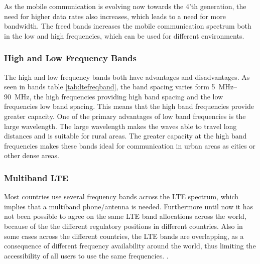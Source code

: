 As the mobile communication is evolving now towards the 4'th generation, the need for higher data rates also increases, which leads to a need for more bandwidth. The freed bands increases the mobile communication spectrum both in the low and high frequencies, which can be used for different environments.  

\subsubsection{High and Low Frequency Bands}
The high and low frequency bands both have advantages and disadvantages. As seen in bands table \ref{tab:ltefreqband}, the band spacing varies form \SIrange{5}{90}{MHz}, the high frequencies providing high band spacing and the low frequencies low band spacing. This means that the high band frequencies provide greater capacity. One of the primary advantages of low band frequencies is the large wavelength. The large wavelength makes the waves able to travel long distances and is suitable for rural areas. The greater capacity at the high band frequencies makes these bands ideal for communication in urban areas as cities or other dense areas.

\subsubsection{Multiband LTE}
Most countries use several frequency bands across the LTE spectrum, which implies that a multiband phone/antenna is needed.  
Furthermore until now it has not been possible to agree on the same LTE band allocations across the world, because of the the different regulatory positions in different countries. Also in some cases across the different countries, the LTE bands are overlapping, as a consequence of different frequency availability around the world, thus limiting the accessibility of all users to use the same frequencies. \cite{radio2015electronics}.  

